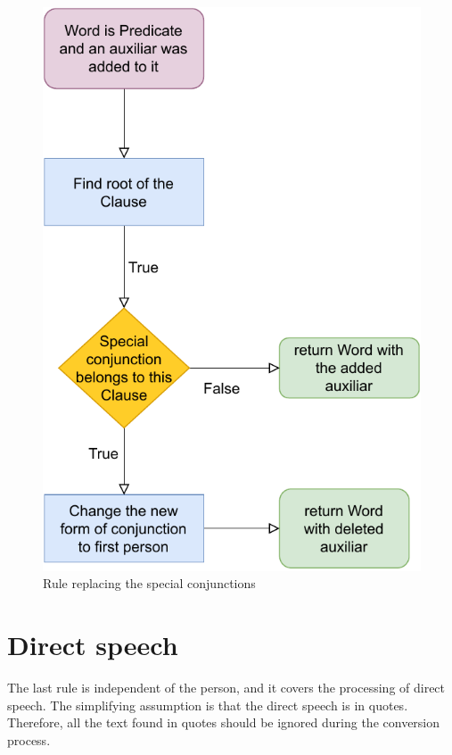 \begin{figure}[!htbp]
\includegraphics[]{data/Erich-Conjs-Rule.pdf}
\caption{Rule replacing the special conjunctions}
\label{fig:erich-conjs-rule}
\end{figure}


\section{Direct speech}

The last rule is independent of the person, and it covers the processing of direct speech. The simplifying assumption is that the direct speech is in quotes. Therefore, all the text found in quotes should be ignored during the conversion process.

